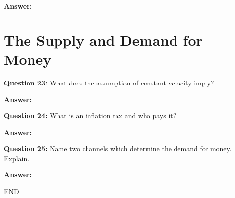 \documentclass[a4paper, 11pt]{article}
\begin{document}
\textbf{Answer:} 

\section{The Supply and Demand for Money}

\textbf{Question 23:} What does the assumption of constant velocity imply?

\textbf{Answer:} 


\textbf{Question 24:} What is an inflation tax and who pays it?

\textbf{Answer:} 


\textbf{Question 25:} Name two channels which determine the demand for money. Explain.

\textbf{Answer:} 



\centering
END
\end{document}
